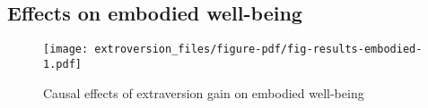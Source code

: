 \documentclass[
  singlecolumn]{report}
\begin{document}
\hypertarget{effects-on-embodied-well-being}{%
\subsection{Effects on embodied
well-being}\label{effects-on-embodied-well-being}}

\begin{figure}

{\centering \texttt{[image: extroversion\_files/figure-pdf/fig-results-embodied-1.pdf]}

}

\caption{\label{fig-results-embodied}Causal effects of extraversion gain
on embodied well-being}

\end{figure}

\hypertarget{tbl-results-embodied}{}
\end{document}
